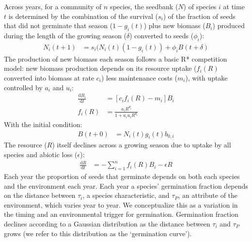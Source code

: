 \documentclass[11pt,letterpaper]{article}
\begin{document}
Across years, for a community of \(n\) species, the seedbank ($N$) of species $i$ at time $t$ is determined by the combination of the survival ($s_i$) of the fraction of seeds that did not germinate that season ($1-g_{i}(t)$) plus new biomass ($B_i$) produced during the length of the  growing season ($\delta$) converted to seeds ($\phi_i$):
\begin{align}
N_{i}(t+1) & =
s_{i}(N_{i}(t)(1-g_{i}(t))+\phi_{i}B(t+\delta)
\end{align}
The production of new biomass each season follows a basic R* competition model: new biomass production depends on its resource uptake ($f_i(R)$ converted into biomass at rate $c_i$) less maintenance costs ($m_i$), with uptake controlled by $a_i$ and $u_i$:
\begin{align}
\frac{\mathrm{d}B_{i}}{\mathrm{d}t} &  = [c_{i}f_{i}(R) - m_{i}]B_{i} 
\\
f_{i}(R) & = \frac{a_{i}R^{\theta_{i}}}{1+a_{i}u_{i}R^{\theta_{i}}}
\end{align}
With the initial condition:
\begin{align}
B(t+0) & = N_{i}(t)g_{i}(t)b_{0,i}
\end{align}
The resource ($R$) itself declines across a growing season due to uptake by all species and abiotic loss ($\epsilon$):
\begin{align}
\frac{\mathrm{d}R}{\mathrm{d}t} & = - \sum_{i=1}^{n}f_{i}(R)B_{i} -\epsilon R
\end{align}
Each year the proportion of seeds that germinate depends on both each species and the environment each year. Each year a species' germination fraction depends on the distance between $\tau_i$, a species characteristic, and $\tau_P$, an attribute of the environment, which varies year to year. We conceptualize this as a variation in the timing and an environmental trigger for germination. Germination fraction declines according to a Gaussian distribution as the distance between $\tau_i$ and $\tau_P$ grows (we refer to this distribution as the `germination curve').\\
\end{document}
